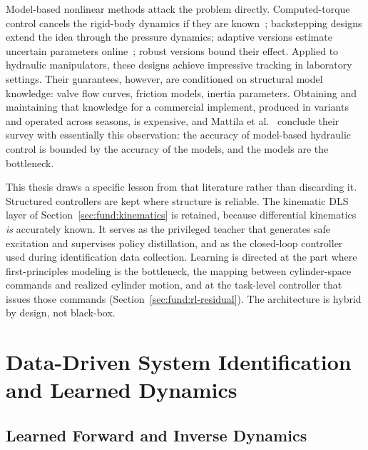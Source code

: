 Model-based nonlinear methods attack the problem directly.
Computed-torque control cancels the rigid-body dynamics if they are
known~\cite{slotine1991applied}; backstepping
designs extend the idea through the pressure dynamics; adaptive versions
estimate uncertain parameters online~\cite{astrom1995adaptive}; robust
versions bound their effect. Applied to hydraulic manipulators, these
designs achieve impressive tracking in laboratory settings. Their
guarantees, however, are conditioned on structural model knowledge:
valve flow curves, friction models, inertia parameters. Obtaining and
maintaining that knowledge for a commercial implement, produced in
variants and operated across seasons, is expensive, and Mattila et
al.~\cite{mattila2017survey} conclude their survey with essentially this
observation: the accuracy of model-based hydraulic control is bounded by
the accuracy of the models, and the models are the bottleneck.

This thesis draws a specific lesson from that literature rather than
discarding it. Structured controllers are kept where structure is
reliable. The kinematic DLS layer of Section~\ref{sec:fund:kinematics}
is retained, because differential kinematics \emph{is} accurately known.
It serves as the privileged teacher that generates safe excitation and
supervises policy distillation, and as the closed-loop controller used
during identification data collection. Learning is directed at the part
where first-principles modeling is the bottleneck, the mapping between
cylinder-space commands and realized cylinder motion, and at the
task-level controller that issues those commands
(Section~\ref{sec:fund:rl-residual}). The architecture is hybrid by
design, not black-box.

\section{Data-Driven System Identification and Learned Dynamics}
\label{sec:fund:learned-dynamics}

\subsection{Learned Forward and Inverse Dynamics}

